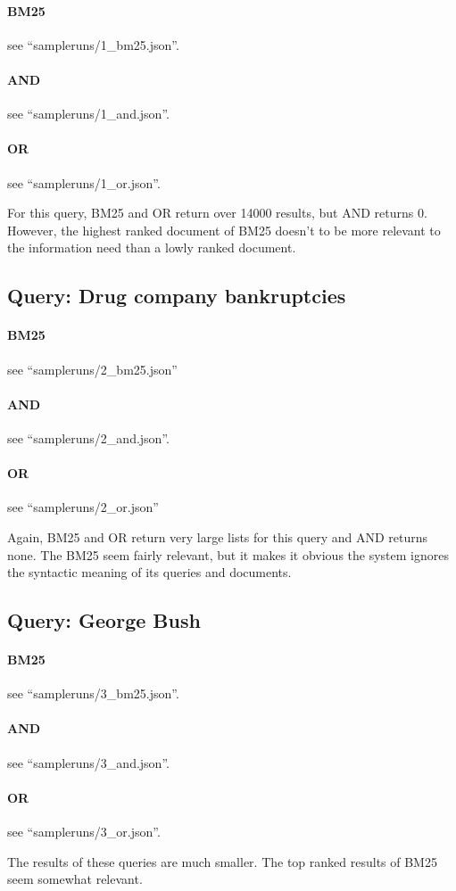 \documentclass[]{article}
\begin{document}
   \paragraph{BM25}
		see ``sampleruns/1\_bm25.json''.
	\paragraph{AND}
		see ``sampleruns/1\_and.json''.
	\paragraph{OR}
      see ``sampleruns/1\_or.json''.
   \par
   For this query, BM25 and OR return over 14000 results, but AND returns 0. However, the highest ranked document of BM25 doesn't to be more relevant to the information need than a lowly ranked document.
   
   \subsection{Query: Drug company bankruptcies}
   \paragraph{BM25}
		see ``sampleruns/2\_bm25.json''
	\paragraph{AND}
		see ``sampleruns/2\_and.json''.
	\paragraph{OR}
      see ``sampleruns/2\_or.json''
   \par
   Again, BM25 and OR return very large lists for this query and AND returns none. The BM25 seem fairly relevant, but it makes it obvious the system ignores the syntactic meaning of its queries and documents. 

   \subsection{Query: George Bush}
   
	\paragraph{BM25}
		see ``sampleruns/3\_bm25.json''.
	\paragraph{AND}
		see ``sampleruns/3\_and.json''.
	\paragraph{OR}
      see ``sampleruns/3\_or.json''.
   \par
   The results of these queries are much smaller. The top ranked results of BM25 seem somewhat relevant.
\end{document}
